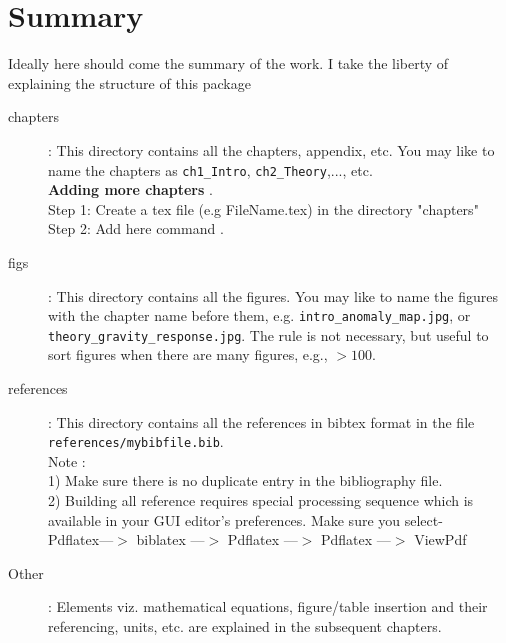 \chapter*{Summary}
\vspace*{-3em}


Ideally here should come the summary of the work. I take the liberty of explaining the structure of this package 
\begin{description}
\item[chapters]: This directory contains all the chapters, appendix, etc. 
	You may like to name the chapters as \verb|ch1_Intro|, \verb|ch2_Theory|,..., etc.\\ \textbf{Adding more chapters }. \\
	Step 1: Create a tex file (e.g FileName.tex) in the directory "chapters" \\
	Step 2: Add here command \verb||. 

\item[figs]: This directory contains all the figures. 
           You may like to name the figures with the chapter name before them, e.g.   
           \verb|intro_anomaly_map.jpg|, or  \verb|theory_gravity_response.jpg|.  
           The rule is not necessary, but useful to sort figures when there are many figures, e.g., $>100$.
\item[references]: 
	This directory contains all the references in bibtex format in the file \verb|references/mybibfile.bib|.\\
	Note :  		\\
	1) Make sure there is no duplicate entry in the bibliography file.\\
    2) Building all reference requires special processing sequence which is available in your GUI editor's preferences. Make sure you select-\\
  			Pdflatex---$>$ biblatex ---$>$ Pdflatex ---$>$ Pdflatex ---$>$ ViewPdf




\item[Other] : Elements viz. mathematical equations, figure/table insertion and their referencing, units, etc. are explained in the subsequent chapters. 

\end{description}

